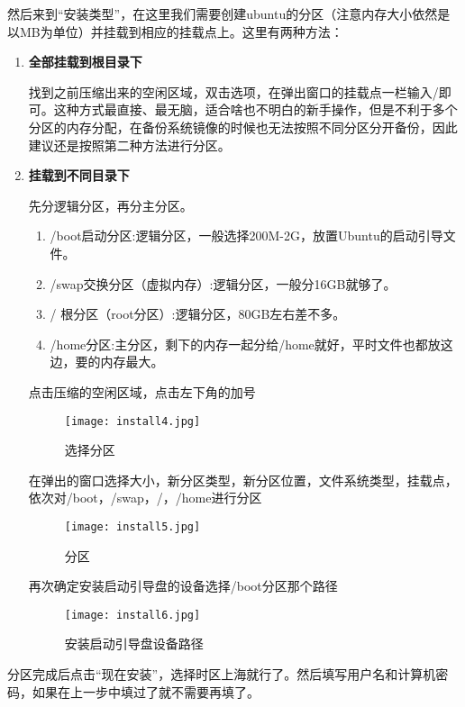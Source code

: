 然后来到“安装类型”，在这里我们需要创建ubuntu的分区（注意内存大小依然是以MB为单位）并挂载到相应的挂载点上。这里有两种方法：
\begin{enumerate}
	\item \textbf{全部挂载到根目录下}

找到之前压缩出来的空闲区域，双击选项，在弹出窗口的挂载点一栏输入/即可。这种方式最直接、最无脑，适合啥也不明白的新手操作，但是不利于多个分区的内存分配，在备份系统镜像的时候也无法按照不同分区分开备份，因此建议还是按照第二种方法进行分区。
	\item \textbf{挂载到不同目录下}

先分逻辑分区，再分主分区。
	\begin{enumerate}
		\item /boot启动分区:逻辑分区，一般选择200M-2G，放置Ubuntu的启动引导文件。
		\item /swap交换分区（虚拟内存）:逻辑分区，一般分16GB就够了。
		\item / 根分区（root分区）:逻辑分区，80GB左右差不多。
		\item /home分区:主分区，剩下的内存一起分给/home就好，平时文件也都放这边，要的内存最大。
	\end{enumerate}

点击压缩的空闲区域，点击左下角的加号

\begin{figure}[H]
    \centering
    \texttt{[image: install4.jpg]}
    \caption{选择分区} %
    \label{fig:install4} %
\end{figure}

在弹出的窗口选择大小，新分区类型，新分区位置，文件系统类型，挂载点，依次对/boot，/swap，/，/home进行分区

\begin{figure}[H]
    \centering
    \texttt{[image: install5.jpg]}
    \caption{分区} %
    \label{fig:install5} %
\end{figure}

再次确定安装启动引导盘的设备选择/boot分区那个路径

\begin{figure}[H]
    \centering
    \texttt{[image: install6.jpg]}
    \caption{安装启动引导盘设备路径} %
    \label{fig:install6} %
\end{figure}

\end{enumerate}
分区完成后点击“现在安装”，选择时区上海就行了。然后填写用户名和计算机密码，如果在上一步中填过了就不需要再填了。

